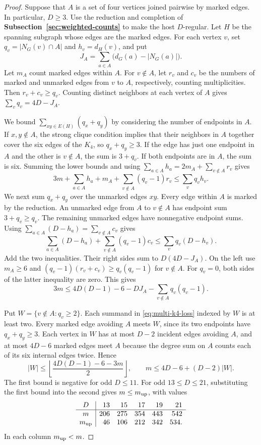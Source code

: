 \documentclass[preprint,11pt,numbers]{elsarticle-arxiv}
\numberwithin{equation}{section}
\theoremstyle{definition}
\begin{document}
\begin{proof}

Suppose that $A$ is a set of four vertices joined pairwise by
marked edges. In particular, $D\geq3$. Use the reduction and
completion of \textbf{Subsection~\ref{sec:weighted-counts}} to
make the host $D$-regular. Let $H$ be the spanning subgraph
whose edges are the marked edges. For each vertex $v$, set
$q_v=|N_G(v)\cap A|$ and $h_v=d_H(v)$, and put
\[
 J_A=\sum_{a\in A}\bigl(d_G(a)-|N_G(a)|\bigr).
\]
Let $m_A$ count marked edges within $A$. For $v\notin A$, let
$r_v$ and $c_v$ be the numbers of marked and unmarked edges
from $v$ to $A$, respectively, counting multiplicities.
Then $r_v+c_v\geq q_v$. Counting distinct neighbors at each
vertex of $A$ gives $\sum_v q_v=4D-J_A$.

We bound $\sum_{xy\in E(H)}(q_x+q_y)$ by considering the
number of endpoints in $A$. If $x,y\notin A$, the strong clique
condition implies that their neighbors in $A$ together cover
the six edges of the $K_4$, so $q_x+q_y\geq3$. If the edge
has just one endpoint in $A$ and the other is $v\notin A$,
the sum is $3+q_v$. If both endpoints are in $A$, the sum
is six. Summing the lower bounds and using
$\sum_{a\in A}h_a=2m_A+\sum_{v\notin A}r_v$ gives
\[
 3m+\sum_{a\in A}h_a+m_A+
 \sum_{v\notin A}(q_v-1)r_v\le\sum_v q_vh_v.
\]
We next sum $q_x+q_y$ over the unmarked edges $xy$.
Every edge within $A$ is marked by the reduction. An
unmarked edge from $A$ to $v\notin A$ has endpoint sum
$3+q_v\geq q_v$. The remaining unmarked edges have
nonnegative endpoint sums. Using
$\sum_{a\in A}(D-h_a)=\sum_{v\notin A}c_v$ gives
\[
 \sum_{a\in A}(D-h_a)+\sum_{v\notin A}(q_v-1)c_v
 \le\sum_v q_v(D-h_v).
\]
Add the two inequalities. Their right sides sum to
$D(4D-J_A)$. On the left use $m_A\geq6$ and
$(q_v-1)(r_v+c_v)\geq q_v(q_v-1)$ for $v\notin A$. For
$q_v=0$, both sides of the latter inequality are zero.
This gives
\begin{equation}\label{eq:multi-k4-loss}
 3m\le4D(D-1)-6-DJ_A-\sum_{v\notin A}q_v(q_v-1).
\end{equation}

Put $W=\{v\notin A:q_v\geq2\}$. Each summand in
\eqref{eq:multi-k4-loss} indexed by $W$ is at least two.
Every marked edge avoiding $A$ meets $W$, since its two
endpoints have $q_x+q_y\geq3$. Each vertex in $W$ has at
most $D-2$ incident edges avoiding $A$, and at most
$4D-6$ marked edges meet $A$ because the degree sum on
$A$ counts each of its six internal edges twice. Hence
\[
 |W|\le\left\lfloor\frac{4D(D-1)-6-3m}{2}\right\rfloor,
 \qquad m\le4D-6+(D-2)|W|.
\]
The first bound is negative for odd $D\le11$. For odd
$13\le D\le21$, substituting the first bound into the
second gives $m\le m_{\rm up}$, with values
\[
\begin{array}{c|rrrrr}
 D&13&15&17&19&21\\ \hline
 m&206&275&354&443&542\\
 m_{\rm up}&46&106&212&342&534.
\end{array}
\]
In each column $m_{\rm up}<m$.


\end{proof}
\end{document}
